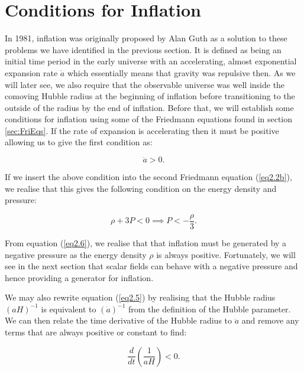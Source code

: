 \documentclass[a4paper,12pt,twoside]{report}
\begin{document}
\section{Conditions for Inflation} \label{sec:CondInflation}

In 1981, inflation was originally proposed by Alan Guth \cite{Guth:1980zm} as a solution to these problems we have identified in the previous section. It is defined as being an initial time period in the early universe with an accelerating, almost exponential expansion rate $\dot{a}$ which essentially means that gravity was repulsive then. As we will later see, we also require that the observable universe was well inside the comoving Hubble radius at the beginning of inflation before transitioning to the outside of the radius by the end of inflation. Before that, we will establish some conditions for inflation using some of the Friedmann equations found in section \ref{sec:FriEqs}. If the rate of expansion is accelerating then it must be positive allowing us to give the first condition as:

\begin{equation}
\ddot{a} > 0. \label{eq2.5}
\end{equation}

If we insert the above condition into the second Friedmann equation (\ref{eq2.2b}), we realise that this gives the following condition on the energy density and pressure:

\begin{equation}
\rho + 3P < 0 \implies P < - \frac{\rho}{3}. \label{eq2.6}
\end{equation}

From equation (\ref{eq2.6}), we realise that that inflation must be generated by a negative pressure as the energy density $\rho$ is always positive. Fortunately, we will see in the next section that scalar fields can behave with a negative pressure and hence providing a generator for inflation.

We may also rewrite equation (\ref{eq2.5}) by realising that the Hubble radius $(aH)^{-1}$ is equivalent to $(\dot{a})^{-1}$ from the definition of the Hubble parameter. We can then relate the time derivative of the Hubble radius to $\ddot{a}$ and remove any terms that are always positive or constant to find:

\begin{equation}
\frac{d}{dt}\left(\frac{1}{aH}\right) < 0. \label{eq2.7}
\end{equation}
\end{document}
